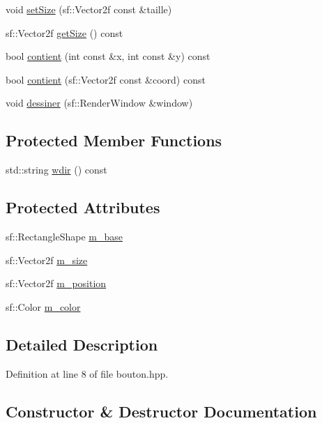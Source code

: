 \begin{DoxyCompactItemize}
\item 
void \hyperlink{classBouton_adc1178a837da30f0fbf621279a63f9f2}{set\+Size} (sf\+::\+Vector2f const \&taille)
\item 
sf\+::\+Vector2f \hyperlink{classBouton_a5eb1b5b89f88a838238456c162f648e6}{get\+Size} () const
\item 
bool \hyperlink{classBouton_a34872de8ba5b4dd5935db5baa8330882}{contient} (int const \&x, int const \&y) const
\item 
bool \hyperlink{classBouton_a8ddcd4bf956aba9593892719f0257231}{contient} (sf\+::\+Vector2f const \&coord) const
\item 
void \hyperlink{classBouton_a57bd7f1865b5d3f698a5a02c92556697}{dessiner} (sf\+::\+Render\+Window \&window)
\end{DoxyCompactItemize}
\subsection*{Protected Member Functions}
\begin{DoxyCompactItemize}
\item 
std\+::string \hyperlink{classBouton_aab0ffe436ee4e87f556f743bda7cd2b8}{wdir} () const
\end{DoxyCompactItemize}
\subsection*{Protected Attributes}
\begin{DoxyCompactItemize}
\item 
sf\+::\+Rectangle\+Shape \hyperlink{classBouton_af2eabc621f9ca506ecc480931a54939a}{m\+\_\+base}
\item 
sf\+::\+Vector2f \hyperlink{classBouton_aad1cc2d04d21e0145520b28053371c4e}{m\+\_\+size}
\item 
sf\+::\+Vector2f \hyperlink{classBouton_ab667f97c8bdea7263faa608d5efa67c2}{m\+\_\+position}
\item 
sf\+::\+Color \hyperlink{classBouton_ac83f8fb8ff41a2df355ce974e95460ee}{m\+\_\+color}
\end{DoxyCompactItemize}


\subsection{Detailed Description}


Definition at line 8 of file bouton.\+hpp.



\subsection{Constructor \& Destructor Documentation}
\mbox{\label{classBouton_ad1e4f684cad81db47393df0be7a65658}} 
